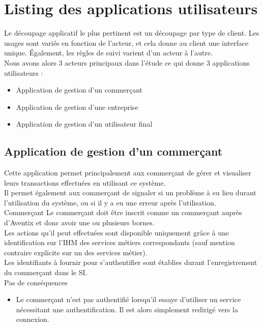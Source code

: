 
\section{Listing des applications utilisateurs}

Le découpage applicatif le plus pertinent est un découpage par type de client.
Les usages sont variés en fonction de l'acteur, et cela donne au client une
interface unique. Également, les règles de suivi varient d'un acteur à
l'autre. \\

Nous avons alors 3 acteurs principaux dans l'étude ce qui donne 3 applications
utilisateurs :

\begin{itemize}
  \item Application de gestion d'un commerçant
  \item Application de gestion d'une entreprise
  \item Application de gestion d'un utilisateur final
\end{itemize}

\subsection{Application de gestion d'un commerçant}

\CUBref
{}%
{
  Cette application permet principalement aux commerçant de gérer et visualiser
  leurs transactions effectuées en utilisant ce système. \\

  Il permet également aux commerçant de signaler si un problème à eu lieu
  durant l'utilisation du système, ou si il y a eu une erreur après
  l'utilisation. \\
}
{Commerçant}
{
  Le commerçant doit être inscrit comme un commerçant auprès d'Aventix et donc
  avoir une ou plusieurs bornes. \\

  Les actions qu'il peut effectuées sont disponible uniquement grâce à une
  identification sur l'IHM des services métiers correspondants (sauf mention
  contraire explicite sur un des services métier). \\

  Les identifiants à fournir pour s'authentifier sont établies durant
  l'enregistrement du commerçant dans le SI. \\
}
{Pas de conséquences}
{
  \begin{itemize}
    \item Le commerçant n'est pas authentifié lorsqu'il essaye d'utiliser un
      service nécessitant une authentification. Il est alors simplement redirigé
      vers la connexion.
  \end{itemize}
}

